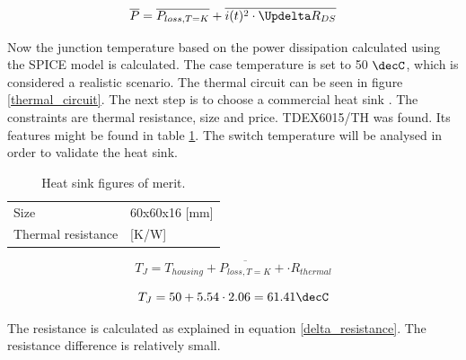 
\begin{equation} \label{total_losses}
\overline{P} = \overline{P_{loss, T = K}} + \overline{i(t)^2 \cdot \Updelta R_{DS}}
\end{equation}

Now the junction temperature based on the power dissipation calculated using the SPICE model is calculated. The case  temperature is set to 50 $\decC$, which is considered a realistic scenario. The thermal circuit can be seen in figure \ref{thermal_circuit}. The next step is to choose a commercial heat sink . The constraints are thermal resistance, size and price. TDEX6015/TH was found. Its features might be found in table \ref{heatsink_features}. The switch temperature will be analysed in order to validate the heat sink.

\begin{table}[htbp]
	\centering
	\begin{tabular}{|p{6cm}|>{\centering}p{8cm}|}
		\hline
		\rowcolor{lightgray}\multicolumn{2}{|l|}{ \textbf{Features}} \\ \hline
		Size & 60x60x16 [mm]  \tabularnewline \hline
		Thermal resistance & 2 [K/W]  \tabularnewline \hline
		
	\end{tabular}
	\caption{Heat sink figures of merit.}
	\label{heatsink_features}
\end{table}

\begin{equation} \label{switch_temperature}
T_{J} = T_{housing} + \overline{P_{loss, T = K}} + \cdot  R_{thermal}
\end{equation}

\begin{equation} \label{switch_temperature_w_values}
T_{J} = 50 + 5.54 \cdot  2.06 = 61.41 \decC
\end{equation}

The resistance  is calculated as explained in equation \ref{delta_resistance}. The resistance difference is relatively small.

